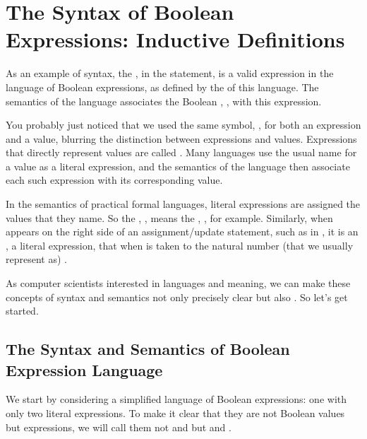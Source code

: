 \documentclass[letterpaper,10pt,english]{sphinxmanual}
\begin{document}
\section{The Syntax of Boolean Expressions: Inductive Definitions}
\label{\detokenize{08-boolean-algebra:the-syntax-of-boolean-expressions-inductive-definitions}}
As an example of syntax, the , in the statement,  is a valid expression in the language of Boolean expressions,
as defined by the  of this language. The semantics of the
language associates the Boolean , , with this expression.

You probably just noticed that we used the same symbol, , for
both an expression and a value, blurring the distinction between
expressions and values. Expressions that directly represent values are
called . Many languages use the usual name for a
value as a literal expression, and the semantics of the language then
associate each such expression with its corresponding value.

In the semantics of practical formal languages, literal expressions
are assigned the values that they name. So the , ,
means the , , for example. Similarly, when  appears on
the right side of an assignment/update statement, such as in ,
it is an , a literal expression, that when  is
taken to  the natural number (that we usually represent as) .

As computer scientists interested in languages and meaning, we can
make these concepts of syntax and semantics not only precisely clear
but also . So let’s get started.


\subsection{The Syntax and Semantics of  Boolean Expression Language}
\label{\detokenize{08-boolean-algebra:the-syntax-and-semantics-of-simplified-boolean-expression-language}}
We start by considering a simplified language of Boolean expressions:
one with only two literal expressions.  To make it clear that they are
not Boolean values but expressions, we will call them not  and
 but  and .
\end{document}
